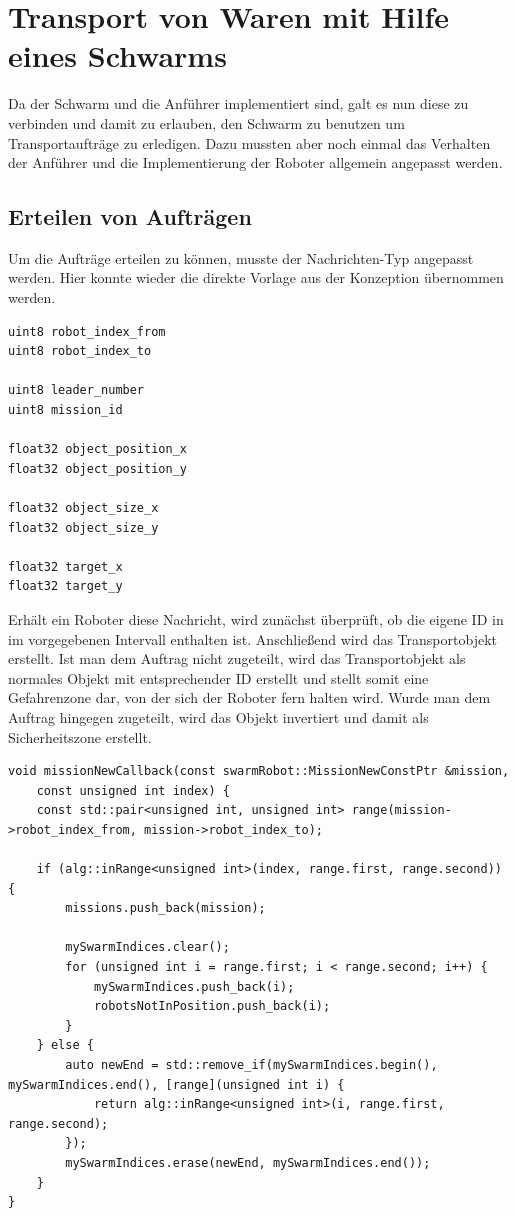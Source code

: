 \section{Transport von Waren mit Hilfe eines Schwarms}

Da der Schwarm und die Anführer implementiert sind, galt es nun diese zu verbinden und damit zu erlauben, den Schwarm zu benutzen um Transportaufträge zu erledigen. Dazu mussten aber noch einmal das Verhalten der Anführer und die Implementierung der Roboter allgemein angepasst werden.

\subsection*{Erteilen von Aufträgen}

Um die Aufträge erteilen zu können, musste der Nachrichten-Typ angepasst werden. Hier konnte wieder die direkte Vorlage aus der Konzeption übernommen werden.

\begin{lstlisting}[style=ros, title=Nachrichten-Typ: New\_Mission]
uint8 robot_index_from
uint8 robot_index_to

uint8 leader_number
uint8 mission_id

float32 object_position_x
float32 object_position_y

float32 object_size_x
float32 object_size_y

float32 target_x
float32 target_y
\end{lstlisting}

Erhält ein Roboter diese Nachricht, wird zunächst überprüft, ob die eigene ID in im vorgegebenen Intervall enthalten ist. Anschließend wird das Transportobjekt erstellt. Ist man dem Auftrag nicht zugeteilt, wird das Transportobjekt als normales Objekt mit entsprechender ID erstellt und stellt somit eine Gefahrenzone dar, von der sich der Roboter fern halten wird.
Wurde man dem Auftrag hingegen zugeteilt, wird das Objekt invertiert und damit als Sicherheitszone erstellt.

\begin{lstlisting}[style=cpp, title=Teilen des eigenen Schwarms nach dem Erhalt eines Auftrags]
void missionNewCallback(const swarmRobot::MissionNewConstPtr &mission,
	const unsigned int index) {
    const std::pair<unsigned int, unsigned int> range(mission->robot_index_from, mission->robot_index_to);

    if (alg::inRange<unsigned int>(index, range.first, range.second)) {
        missions.push_back(mission);

        mySwarmIndices.clear();
        for (unsigned int i = range.first; i < range.second; i++) {
            mySwarmIndices.push_back(i);
            robotsNotInPosition.push_back(i);
        }
    } else {
        auto newEnd = std::remove_if(mySwarmIndices.begin(), mySwarmIndices.end(), [range](unsigned int i) {
            return alg::inRange<unsigned int>(i, range.first, range.second);
        });
        mySwarmIndices.erase(newEnd, mySwarmIndices.end());
    }
}
\end{lstlisting}

